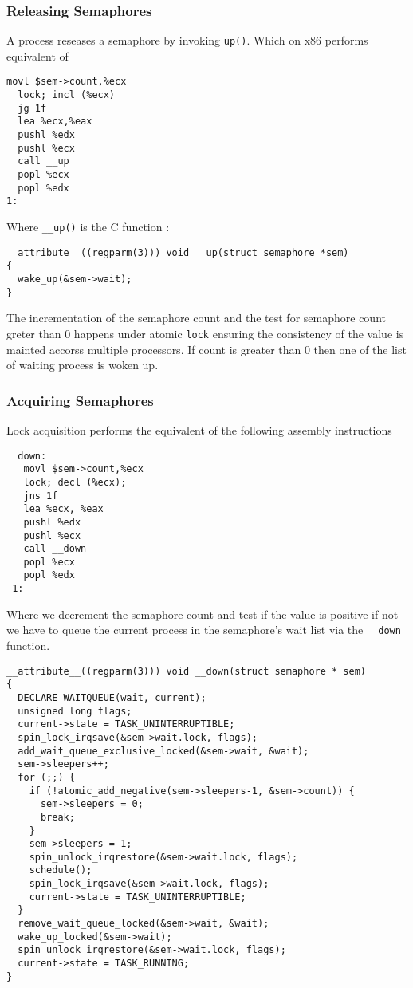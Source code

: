 \documentclass{article}
\begin{document}

\subsubsection{Releasing Semaphores}

A process reseases a semaphore by invoking \lstinline{up()}. Which on
x86 performs equivalent of

\begin{lstlisting}[language=anX86]
  movl $sem->count,%ecx
  lock; incl (%ecx)
  jg 1f
  lea %ecx,%eax
  pushl %edx
  pushl %ecx
  call __up
  popl %ecx
  popl %edx
1:
\end{lstlisting}

Where \lstinline{__up()} is the C function :

\begin{lstlisting}
__attribute__((regparm(3))) void __up(struct semaphore *sem)
{
  wake_up(&sem->wait);
}  
\end{lstlisting}

The incrementation of the semaphore count and the test for semaphore
count greter than 0 happens under atomic \lstinline{lock} ensuring the
consistency of the value is mainted accorss multiple processors. If
count is greater than 0 then one of the list of waiting process is
woken up.

\subsubsection{Acquiring Semaphores}

Lock acquisition performs the equivalent of the following assembly
instructions

\begin{lstlisting}
  down:
   movl $sem->count,%ecx
   lock; decl (%ecx);
   jns 1f
   lea %ecx, %eax
   pushl %edx
   pushl %ecx
   call __down
   popl %ecx
   popl %edx
 1:
\end{lstlisting}

Where we decrement the semaphore count and test if the value is
positive if not we have to queue the current process in the
semaphore's wait list via the \lstinline{__down} function.

\begin{lstlisting}
__attribute__((regparm(3))) void __down(struct semaphore * sem)
{
  DECLARE_WAITQUEUE(wait, current);
  unsigned long flags;
  current->state = TASK_UNINTERRUPTIBLE;
  spin_lock_irqsave(&sem->wait.lock, flags);
  add_wait_queue_exclusive_locked(&sem->wait, &wait);
  sem->sleepers++;
  for (;;) {
    if (!atomic_add_negative(sem->sleepers-1, &sem->count)) {
      sem->sleepers = 0;
      break;
    }
    sem->sleepers = 1;
    spin_unlock_irqrestore(&sem->wait.lock, flags);
    schedule();
    spin_lock_irqsave(&sem->wait.lock, flags);
    current->state = TASK_UNINTERRUPTIBLE;
  }
  remove_wait_queue_locked(&sem->wait, &wait);
  wake_up_locked(&sem->wait);
  spin_unlock_irqrestore(&sem->wait.lock, flags);
  current->state = TASK_RUNNING;
}
\end{lstlisting}
\end{document}
